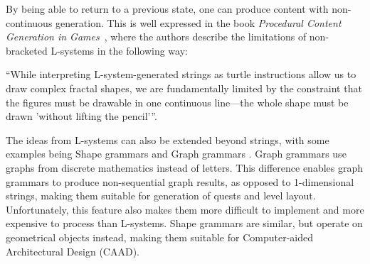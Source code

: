 By being able to return to a previous state, one can produce content with non-continuous generation.
This is well expressed in the book \textit{Procedural Content Generation in Games}~\cite[p.77]{PCG_in_games}, where the authors describe the limitations of non-bracketed L-systems in the following way:
\begin{center}
“While interpreting L-system-generated strings as turtle instructions allow us to draw complex fractal shapes, we are fundamentally limited by the constraint that the figures must be drawable in one continuous line—the whole shape must be drawn 'without lifting the pencil'”. 
\end{center}

The ideas from L-systems can also be extended beyond strings, with some examples being Shape grammars \cite{shape_grammars} and Graph grammars \cite{graph_grammars}.
Graph grammars use graphs from discrete mathematics instead of letters.
This difference enables graph grammars to produce non-sequential graph results, as opposed to 1-dimensional strings, making them suitable for generation of quests and level layout.
Unfortunately, this feature also makes them more difficult to implement and more expensive to process than L-systems.
Shape grammars are similar, but operate on geometrical objects instead, making them suitable for Computer-aided Architectural Design (CAAD).